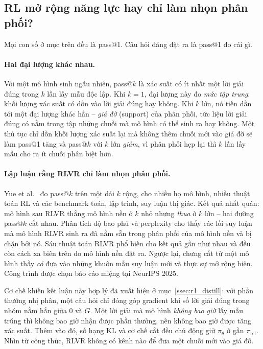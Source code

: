 \subsection{RL mở rộng năng lực hay chỉ làm nhọn phân phối?}
\label{ssec:rl_capability_debate}

Mọi con số ở mục trên đều là pass@1. Câu hỏi đáng đặt ra là pass@1 đo cái gì.

\paragraph{Hai đại lượng khác nhau.}
Với một mô hình sinh ngẫu nhiên, pass@$k$ là xác suất có ít nhất một lời giải đúng trong $k$ lần lấy mẫu độc lập. Khi $k = 1$, đại lượng này đo \emph{mức tập trung}: khối lượng xác suất có dồn vào lời giải đúng hay không. Khi $k$ lớn, nó tiến dần tới một đại lượng khác hẳn -- \emph{giá đỡ} (support) của phân phối, tức liệu lời giải đúng có nằm trong tập những chuỗi mà mô hình có thể sinh ra hay không. Một thủ tục chỉ dồn khối lượng xác suất lại mà không thêm chuỗi mới vào giá đỡ sẽ làm pass@1 tăng và pass@$k$ với $k$ lớn \emph{giảm}, vì phân phối hẹp lại thì $k$ lần lấy mẫu cho ra ít chuỗi phân biệt hơn.

\paragraph{Lập luận rằng RLVR chỉ làm nhọn phân phối.}
Yue et al.~\cite{yue2025rlboundary} đo pass@$k$ trên một dải $k$ rộng, cho nhiều họ mô hình, nhiều thuật toán RL và các benchmark toán, lập trình, suy luận thị giác. Kết quả nhất quán: mô hình sau RLVR thắng mô hình nền ở $k$ nhỏ nhưng \emph{thua} ở $k$ lớn -- hai đường pass@$k$ cắt nhau. Phân tích độ bao phủ và perplexity cho thấy các lối suy luận mà mô hình RLVR sinh ra đã nằm sẵn trong phân phối của mô hình nền và bị chặn bởi nó. Sáu thuật toán RLVR phổ biến cho kết quả gần như nhau và đều còn cách xa biên trên do mô hình nền đặt ra. Ngược lại, chưng cất từ một mô hình thầy \emph{có} đưa vào những khuôn mẫu suy luận mới và thực sự mở rộng biên. Công trình được chọn báo cáo miệng tại NeurIPS 2025.

Cơ chế khiến kết luận này hợp lý đã xuất hiện ở mục~\ref{ssec:r1_distill}: với phần thưởng nhị phân, một câu hỏi chỉ đóng góp gradient khi số lời giải đúng trong nhóm nằm hẳn giữa 0 và $G$. Một lời giải mà mô hình \emph{không bao giờ} lấy mẫu trúng thì không bao giờ nhận được phần thưởng, nên không bao giờ được tăng xác suất. Thêm vào đó, số hạng KL và cơ chế cắt đều chủ động giữ $\pi_\theta$ ở gần $\pi_{\mathrm{ref}}$. Nhìn từ công thức, RLVR không có kênh nào để đưa một chuỗi mới vào giá đỡ.

